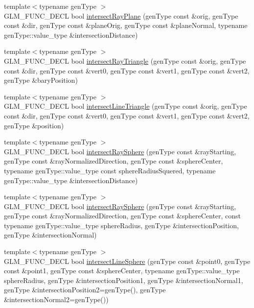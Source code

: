 \begin{DoxyCompactItemize}
\item 
{\footnotesize template$<$typename gen\+Type $>$ }\\G\+L\+M\+\_\+\+F\+U\+N\+C\+\_\+\+D\+E\+CL bool \hyperlink{group__gtx__intersect_gad3697a9700ea379739a667ea02573488}{intersect\+Ray\+Plane} (gen\+Type const \&orig, gen\+Type const \&dir, gen\+Type const \&plane\+Orig, gen\+Type const \&plane\+Normal, typename gen\+Type\+::value\+\_\+type \&intersection\+Distance)
\item 
{\footnotesize template$<$typename gen\+Type $>$ }\\G\+L\+M\+\_\+\+F\+U\+N\+C\+\_\+\+D\+E\+CL bool \hyperlink{group__gtx__intersect_gab16c1b47c10451e7604b51b39a7ef21d}{intersect\+Ray\+Triangle} (gen\+Type const \&orig, gen\+Type const \&dir, gen\+Type const \&vert0, gen\+Type const \&vert1, gen\+Type const \&vert2, gen\+Type \&bary\+Position)
\item 
{\footnotesize template$<$typename gen\+Type $>$ }\\G\+L\+M\+\_\+\+F\+U\+N\+C\+\_\+\+D\+E\+CL bool \hyperlink{group__gtx__intersect_ga9d29b9b3acb504d43986502f42740df4}{intersect\+Line\+Triangle} (gen\+Type const \&orig, gen\+Type const \&dir, gen\+Type const \&vert0, gen\+Type const \&vert1, gen\+Type const \&vert2, gen\+Type \&position)
\item 
{\footnotesize template$<$typename gen\+Type $>$ }\\G\+L\+M\+\_\+\+F\+U\+N\+C\+\_\+\+D\+E\+CL bool \hyperlink{group__gtx__intersect_gac88f8cd84c4bcb5b947d56acbbcfa56e}{intersect\+Ray\+Sphere} (gen\+Type const \&ray\+Starting, gen\+Type const \&ray\+Normalized\+Direction, gen\+Type const \&sphere\+Center, typename gen\+Type\+::value\+\_\+type const sphere\+Radius\+Squered, typename gen\+Type\+::value\+\_\+type \&intersection\+Distance)
\item 
{\footnotesize template$<$typename gen\+Type $>$ }\\G\+L\+M\+\_\+\+F\+U\+N\+C\+\_\+\+D\+E\+CL bool \hyperlink{group__gtx__intersect_gad28c00515b823b579c608aafa1100c1d}{intersect\+Ray\+Sphere} (gen\+Type const \&ray\+Starting, gen\+Type const \&ray\+Normalized\+Direction, gen\+Type const \&sphere\+Center, const typename gen\+Type\+::value\+\_\+type sphere\+Radius, gen\+Type \&intersection\+Position, gen\+Type \&intersection\+Normal)
\item 
{\footnotesize template$<$typename gen\+Type $>$ }\\G\+L\+M\+\_\+\+F\+U\+N\+C\+\_\+\+D\+E\+CL bool \hyperlink{group__gtx__intersect_ga9c68139f3d8a4f3d7fe45f9dbc0de5b7}{intersect\+Line\+Sphere} (gen\+Type const \&point0, gen\+Type const \&point1, gen\+Type const \&sphere\+Center, typename gen\+Type\+::value\+\_\+type sphere\+Radius, gen\+Type \&intersection\+Position1, gen\+Type \&intersection\+Normal1, gen\+Type \&intersection\+Position2=gen\+Type(), gen\+Type \&intersection\+Normal2=gen\+Type())

\end{DoxyCompactItemize}
